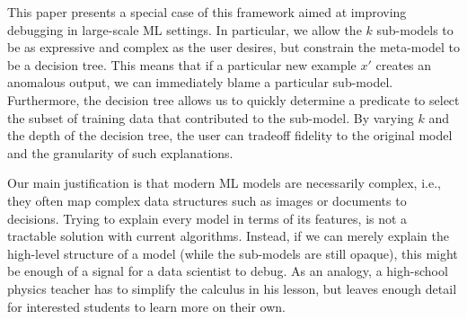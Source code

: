 This paper presents a special case of this framework aimed at improving debugging in large-scale ML settings. 
In particular, we allow the $k$ sub-models to be as expressive and complex as the user desires, but constrain the meta-model to be a decision tree.
This means that if a particular new example $x'$ creates an anomalous output, we can immediately blame a particular sub-model.
Furthermore, the decision tree allows us to quickly determine a predicate to select the subset of training data that contributed to the sub-model.
By varying $k$ and the depth of the decision tree, the user can tradeoff fidelity to the original model and the granularity of such explanations.


Our main justification is that modern ML models are necessarily complex, i.e., they often map complex data structures such as images or documents to decisions. Trying to explain every model in terms of its features, is not a tractable solution with current algorithms. Instead, if we can merely explain the high-level structure of a model (while the sub-models are still opaque), this might be enough of a signal for a data scientist to debug. As an analogy, a high-school physics teacher has to simplify the calculus in his lesson, but leaves enough detail for interested students to learn more on their own.




























